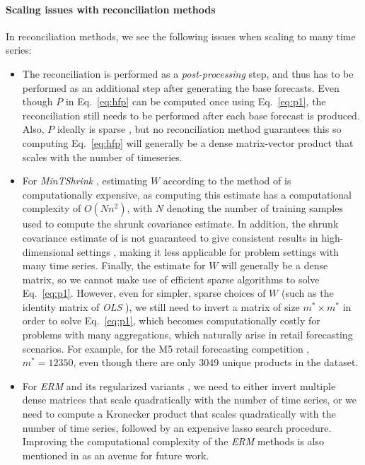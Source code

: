 \documentclass{article}
\begin{document}
\paragraph{Scaling issues with reconciliation methods}
In reconciliation methods, we see the following issues when scaling to many time series:
\begin{itemize}
  \item The reconciliation is performed as a \textit{post-processing} step, and thus has to be performed as an additional step after generating the base forecasts. Even though \(P\) in Eq.~\ref{eq:hfp} can be computed once using Eq.~\eqref{eq:p1}, the reconciliation still needs to be performed after each base forecast is produced. Also, \(P\) ideally is sparse \cite{bentaieb_regularized_2019}, but no reconciliation method guarantees this so computing Eq.~\ref{eq:hfp} will generally be a dense matrix-vector product that scales with the number of timeseries.
  \item For \textit{MinTShrink} \cite{wickramasuriya_optimal_2019}, estimating \(W\) according to the method of \cite{schafer_shrinkage_2005} is computationally expensive, as computing this estimate has a computational complexity of \(O(Nn^2)\), with \(N\) denoting the number of training samples used to compute the shrunk covariance estimate. In addition, the shrunk covariance estimate of \cite{schafer_shrinkage_2005} is not guaranteed to give consistent results in high-dimensional settings \cite{touloumis_nonparametric_2015}, making it less applicable for problem settings with many time series. Finally, the estimate for \(W\) will generally be a dense matrix, so we cannot make use of efficient sparse algorithms to solve Eq.~\eqref{eq:p1}. However, even for simpler, sparse choices of \(W\) (such as the identity matrix of \textit{OLS} \cite{hyndman_optimal_2011}), we still need to invert a matrix of size \(m^* \times m^*\) in order to solve Eq.~\eqref{eq:p1}, which becomes computationally costly for problems with many aggregations, which naturally arise in retail forecasting scenarios. For example, for the M5 retail forecasting competition \cite{makridakis_m5_2020}, \(m^*=12350\), even though there are only 3049 unique products in the dataset.  
  \item For \textit{ERM} and its regularized variants \cite{bentaieb_regularized_2019}, we need to either invert multiple dense matrices that scale quadratically with the number of time series, or we need to compute a Kronecker product that scales quadratically with the number of time series, followed by an expensive lasso search procedure. Improving the computational complexity of the \textit{ERM} methods is also mentioned in \cite{bentaieb_regularized_2019} as an avenue for future work.
\end{itemize}
\end{document}
